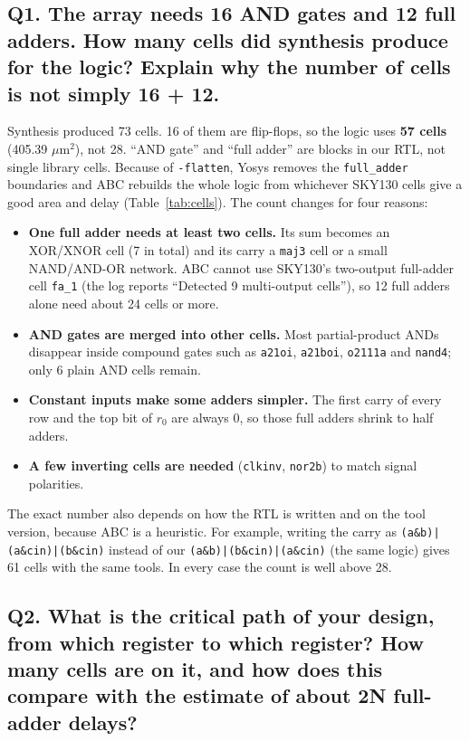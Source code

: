 \documentclass[10pt,a4paper,twocolumn]{article}
\newcommand{\umsq}{$\mu$m$^2$}
\newcommand{\cell}[1]{\texttt{#1}}
\begin{document}
\subsection*{Q1. The array needs 16 AND gates and 12 full adders. How many cells did synthesis produce for the logic? Explain why the number of cells is not simply 16 + 12.}

Synthesis produced 73 cells. 16 of them are flip-flops, so the logic uses \textbf{57 cells} (405.39 \umsq),
not 28. ``AND gate'' and ``full adder'' are blocks in our RTL, not single library cells. Because of
\texttt{-flatten}, Yosys removes the \texttt{full\_adder} boundaries and ABC rebuilds the whole logic from
whichever SKY130 cells give a good area and delay (Table~\ref{tab:cells}). The count changes for four reasons:
\begin{itemize}[nosep]
  \item \textbf{One full adder needs at least two cells.} Its sum becomes an XOR/XNOR cell (7 in total) and its
        carry a \cell{maj3} cell or a small NAND/AND-OR network. ABC cannot use SKY130's two-output full-adder
        cell \cell{fa\_1} (the log reports ``Detected 9 multi-output cells''), so 12 full adders alone need
        about 24 cells or more.
  \item \textbf{AND gates are merged into other cells.} Most partial-product ANDs disappear inside compound
        gates such as \cell{a21oi}, \cell{a21boi}, \cell{o2111a} and \cell{nand4}; only 6 plain AND cells remain.
  \item \textbf{Constant inputs make some adders simpler.} The first carry of every row and the top bit of $r_0$
        are always 0, so those full adders shrink to half adders.
  \item \textbf{A few inverting cells are needed} (\cell{clkinv}, \cell{nor2b}) to match signal polarities.
\end{itemize}
The exact number also depends on how the RTL is written and on the tool version, because ABC is a heuristic.
For example, writing the carry as \texttt{(a\&b)|(a\&cin)|(b\&cin)} instead of our
\texttt{(a\&b)|(b\&cin)|(a\&cin)} (the same logic) gives 61 cells with the same tools. In every case the count
is well above 28.

\subsection*{Q2. What is the critical path of your design, from which register to which register? How many cells are on it, and how does this compare with the estimate of about 2N full-adder delays?}
\end{document}

